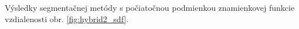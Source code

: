 \documentclass[a4paper,11pt,oneside]{article}%
\begin{document}
Výsledky segmentačnej metódy s počiatočnou podmienkou znamienkovej funkcie vzdialenosti obr. \ref{fig:hybrid2_sdf}.

\begin{figure}[H]  
    \hspace{5px}

\end{figure}
\end{document}
